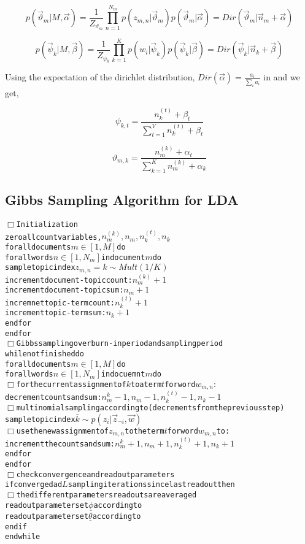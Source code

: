 \begin{equation}\label{eqn:multtheta}
p(\vec{\vartheta}_m|M,\vec{\alpha}) = \frac{1}{Z_{\vartheta_m}} \prod_{n=1}^{N_m} p(z_{m,n}|\vec{\vartheta}_m) p(\vec{\vartheta}_m|\vec{\alpha}) = 	Dir(\vec{\vartheta}_m|\vec{n}_m + \vec{\alpha})
\end{equation}

\begin{equation}\label{eqn:multphi}
p(\vec{\psi}_k|M,\vec{\beta}) = \frac{1}{Z_{\psi_k}} \prod_{k=1}^{K} p(w_{i}|\vec{\psi}_k) p(\vec{\psi}_k|\vec{\beta}) = 	Dir(\vec{\psi}_k|\vec{n}_k + \vec{\beta}) 
\end{equation}

Using the expectation of the dirichlet distribution, \(Dir(\vec{\alpha}) = \frac{a_i}{\sum_i a_i}\) in  and  we get,

\begin{equation}\label{eqn:phi}
\psi_{k,t} = \frac{n_k^{(t)} + \beta_t}{\sum_{t=1}^{V} n_k^{(t)} + \beta_t}
\end{equation}

\begin{equation}\label{eqn:theta}
\vartheta_{m,k} = \frac{n_m^{(k)} + \alpha_t}{\sum_{k=1}^{K} n_m^{(k)} + \alpha_k} 
\end{equation}

\pagebreak

\subsection*{Gibbs Sampling Algorithm for LDA}

\begin{alltt}
\(\Box\) Initialization
zero all count variables, \(n_m^{(k)},n_m,n_k^{(t)},n_k\)
for all documents \(m \in [1,M]\) do
  for all words \(n \in [1,N_m]\) in document \(m\) do
    sample topic index \(z_{m,n} = k \sim Mult(1/K)\)
    increment document-topic count: \(n_m^{(k)} + 1\)
    increment document-topic sum: \(n_m + 1\)
    incremnet topic-term count: \(n_k^{(t)} + 1\)
    increment topic-term sum: \(n_k + 1\)
  end for
end for
\(\Box\) Gibbs sampling over burn-in period and sampling period
while not finished do
  for all documents \(m \in [1,M]\) do
    for all words \(n \in [1,N_m]\) in docuemnt \(m\) do
      \(\Box\) for the current assignment of \(k\) to a term \(t\) for word \(w_{m,n}\) \(\colon\)
      decrement counts and sum:\(n_m^{k}-1,n_m-1,n_k^{(t)}-1,n_k-1\)
      \(\Box\) multinomial sampling according to  (decrements from the previous step)
      sample topic index \(\bar{k} \sim p(z_i|\vec{z}_{\neg i},\vec{w})\)
      \(\Box\) use the new assignment of \(z_{m,n}\) to the term \(t\) for word \(w_{m,n}\) to:
      increment the counts and sum:\(n_m^{k}+1,n_m+1,n_k^{(t)}+1,n_k+1\)
    end for
  end for
  \(\Box\) check convergence and read out parameters
  if converged ad \(L\) sampling iterations since last read out then
    \(\Box\) the different parameters read outs are averaged
    read out parameter set \(\underline{\phi}\) according to 
    read out parameter set \(\underline{\theta}\) according to 
  end if
end while
\end{alltt}


